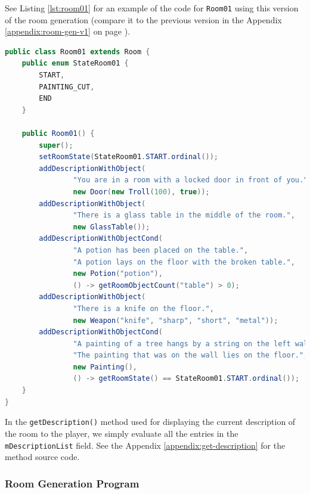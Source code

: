 \documentclass[11pt]{article}
\begin{document}
See Listing \ref{lst:room01} for an example of the code for \texttt{Room01} using this version of the room generation (compare it to the previous version in the Appendix \ref{appendix:room-gen-v1} on page \pageref{appendix:room-gen-v1}).

\begin{lstlisting}[language=Java, caption=Room01.java (Version 2), label=lst:room01]
public class Room01 extends Room {
    public enum StateRoom01 {
        START,
        PAINTING_CUT,
        END
    }

    public Room01() {
        super();
        setRoomState(StateRoom01.START.ordinal());
        addDescriptionWithObject(
                "You are in a room with a locked door in front of you.",
                new Door(new Troll(100), true));
        addDescriptionWithObject(
                "There is a glass table in the middle of the room.",
                new GlassTable());
        addDescriptionWithObjectCond(
                "A potion has been placed on the table.",
                "A potion lays on the floor with the broken table.",
                new Potion("potion"),
                () -> getRoomObjectCount("table") > 0);
        addDescriptionWithObject(
                "There is a knife on the floor.",
                new Weapon("knife", "sharp", "short", "metal"));
        addDescriptionWithObjectCond(
                "A painting of a tree hangs by a string on the left wall.",
                "The painting that was on the wall lies on the floor.",
                new Painting(),
                () -> getRoomState() == StateRoom01.START.ordinal());
    }
}
\end{lstlisting}

In the \texttt{getDescription()} method used for displaying the current description of the room to the player, we simply evaluate all the entries in the \texttt{mDescriptionList} field. See the Appendix \ref{appendix:get-description} for the method source code.

\subsubsection{Room Generation Program}
\end{document}
